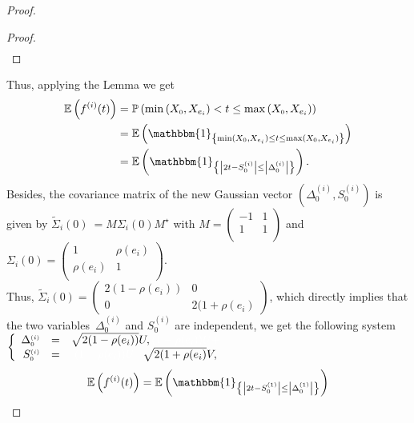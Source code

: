 \documentclass[12pt]{article}
\renewcommand{\tilde}{\widetilde}
\theoremstyle{Theorem}
\begin{document}
\begin{proof}
\begin{proof}
\begin{align*}
\end{align*}
\end{proof}
Thus, applying the Lemma we get 
{\small
\begin{align*}
\mathbb{E}\left(f^{(i)}(t)\right) & = \mathbb{P}\left(\min\left(X_{\scriptscriptstyle 0}, X_{e_i}\right) < t \leq \max\left(X_{\scriptscriptstyle 0}, X_{e_i}\right)\right) \\
& = \mathbb{E}\left(\mathbbm{1}_{\left\{\min(X_{\scriptscriptstyle 0}, X_{e_i}) \leq t \leq \max(X_{\scriptscriptstyle 0}, X_{e_i})\right\}}\right) \\
& = \mathbb{E}\left(\mathbbm{1}_{\left\{ \left|2t - S^{\scriptscriptstyle (i)}_{\scriptscriptstyle 0}\right| \leq \left|\Delta^{\scriptscriptstyle (i)}_{\scriptscriptstyle 0}\right|\right\}}\right).
\end{align*}}Besides, the covariance matrix of the new Gaussian vector $\left(\Delta^{\scriptscriptstyle (i)}_{\scriptscriptstyle 0}, S^{\scriptscriptstyle (i)}_{\scriptscriptstyle 0}\right)$ is given by ${\tilde{\Sigma}_{i}(0)~= M\Sigma_{i}(0) M^{\star}}$ with {\small $M = \begin{pmatrix}
-1 & 1 \\
1 & 1  \\
\end{pmatrix}$} and $\Sigma_{i}(0) = \begin{pmatrix} 1 & \rho(e_i) \\
\rho(e_i) & 1  \\ 
\end{pmatrix}.$ \\
Thus, $\tilde{\Sigma}_{i}(0) = \begin{pmatrix}  2(1-\rho(e_i)) & 0 \\ 0 & 2(1+\rho(e_i)  \end{pmatrix}$, which directly  implies that the two variables~$\Delta^{\scriptscriptstyle (i)}_{\scriptscriptstyle 0}$ and $S^{\scriptscriptstyle (i)}_{\scriptscriptstyle 0}$ are independent, we get the following system 
$\left\{
 \begin{array}{rlc}
  \Delta^{\scriptscriptstyle (i)}_{\scriptscriptstyle 0} & = & \sqrt{2(1-\rho(e_i))}U, \textcolor{white}{(1-\rho(e_i))U + }\\
  S^{\scriptscriptstyle (i)}_{\scriptscriptstyle 0} & = & \textcolor{white}{(1-\rho(e_i))U + } \sqrt{2(1+\rho(e_i)}V, 
\end{array}
\right.$
{\small
\begin{align*}
\mathbb{E}\left(f^{(i)}(t)\right) & = \mathbb{E}\left(\mathbbm{1}_{\left\{ \left|2t - S^{\scriptscriptstyle (1)}_{\scriptscriptstyle 0}\right| \leq \left|\Delta^{\scriptscriptstyle (1)}_{\scriptscriptstyle 0}\right|\right\}}\right) \\

\end{align*}}
\end{proof}
\end{document}
